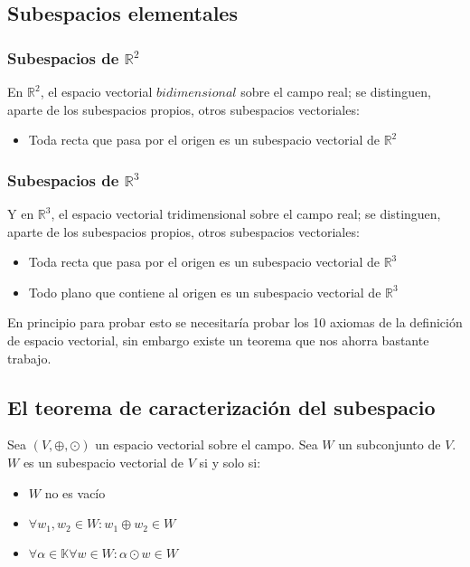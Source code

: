\subsection{Subespacios elementales}
\subsubsection{Subespacios de $\mathbb{R}^2$}
En $\mathbb{R}^2$, el espacio vectorial $bidimensional$ sobre el campo real; se distinguen, aparte de los subespacios propios, otros subespacios vectoriales:


\begin{itemize}
\item Toda recta que pasa por el origen es un subespacio vectorial de $\mathbb{R}^2$

\end{itemize}
\subsubsection{Subespacios de $\mathbb{R}^3$}
Y en $\mathbb{R}^3$, el espacio vectorial tridimensional sobre el campo real; se distinguen, aparte de los subespacios propios, otros subespacios vectoriales:

\begin{itemize}
\item Toda recta que pasa por el origen es un subespacio vectorial de $\mathbb{R}^3$
\item Todo plano que contiene al origen es un subespacio vectorial de $\mathbb{R}^3$
\end{itemize}

En principio para probar esto se necesitaría probar los 10 axiomas de la definición de espacio vectorial, sin embargo existe un teorema que nos ahorra bastante trabajo.


\newpage
\subsection{El teorema de caracterización del subespacio}

\begin{theorem}
Sea $\left(V, \oplus, \odot\right)$ un espacio vectorial sobre el campo. Sea $W$ un subconjunto de $V$. $W$ es un subespacio vectorial de $V$ si y solo si:
	
	\begin{itemize}
	\item $W$ no es vac\'io
	\item $\forall w_1, w_2 \in W: w_1\oplus w_2 \in W$
	\item $\forall \alpha \in \mathbb{K} \forall w \in W: \alpha \odot w \in W$
	
	\end{itemize}

\end{theorem}

